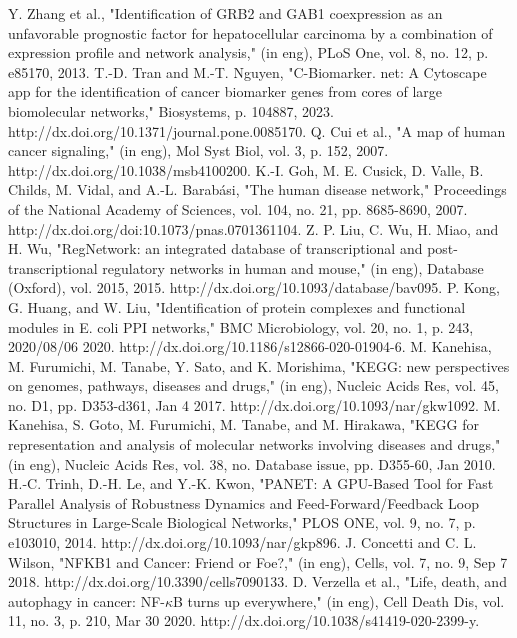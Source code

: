 \documentclass[5p,,preprint,12pt]{elsarticle}
\begin{document}
\begin{thebibliography}{71}
	Y. Zhang et al., "Identification of GRB2 and GAB1 coexpression as an unfavorable prognostic factor for hepatocellular carcinoma by a combination of expression profile and network analysis," (in eng), PLoS One, vol. 8, no. 12, p. e85170, 2013.
	T.-D. Tran and M.-T. Nguyen, "C-Biomarker. net: A Cytoscape app for the identification of cancer biomarker genes from cores of large biomolecular networks," Biosystems, p. 104887, 2023. http://dx.doi.org/10.1371/journal.pone.0085170.
	Q. Cui et al., "A map of human cancer signaling," (in eng), Mol Syst Biol, vol. 3, p. 152, 2007. http://dx.doi.org/10.1038/msb4100200.
	K.-I. Goh, M. E. Cusick, D. Valle, B. Childs, M. Vidal, and A.-L. Barabási, "The human disease network," Proceedings of the National Academy of Sciences, vol. 104, no. 21, pp. 8685-8690, 2007. http://dx.doi.org/doi:10.1073/pnas.0701361104.
	Z. P. Liu, C. Wu, H. Miao, and H. Wu, "RegNetwork: an integrated database of transcriptional and post-transcriptional regulatory networks in human and mouse," (in eng), Database (Oxford), vol. 2015, 2015. http://dx.doi.org/10.1093/database/bav095.
	P. Kong, G. Huang, and W. Liu, "Identification of protein complexes and functional modules in E. coli PPI networks," BMC Microbiology, vol. 20, no. 1, p. 243, 2020/08/06 2020. http://dx.doi.org/10.1186/s12866-020-01904-6.
	M. Kanehisa, M. Furumichi, M. Tanabe, Y. Sato, and K. Morishima, "KEGG: new perspectives on genomes, pathways, diseases and drugs," (in eng), Nucleic Acids Res, vol. 45, no. D1, pp. D353-d361, Jan 4 2017. http://dx.doi.org/10.1093/nar/gkw1092.
	M. Kanehisa, S. Goto, M. Furumichi, M. Tanabe, and M. Hirakawa, "KEGG for representation and analysis of molecular networks involving diseases and drugs," (in eng), Nucleic Acids Res, vol. 38, no. Database issue, pp. D355-60, Jan 2010.
	H.-C. Trinh, D.-H. Le, and Y.-K. Kwon, "PANET: A GPU-Based Tool for Fast Parallel Analysis of Robustness Dynamics and Feed-Forward/Feedback Loop Structures in Large-Scale Biological Networks," PLOS ONE, vol. 9, no. 7, p. e103010, 2014. http://dx.doi.org/10.1093/nar/gkp896.
	J. Concetti and C. L. Wilson, "NFKB1 and Cancer: Friend or Foe?," (in eng), Cells, vol. 7, no. 9, Sep 7 2018. http://dx.doi.org/10.3390/cells7090133.
	D. Verzella et al., "Life, death, and autophagy in cancer: NF-$\kappa$B turns up everywhere," (in eng), Cell Death Dis, vol. 11, no. 3, p. 210, Mar 30 2020. http://dx.doi.org/10.1038/s41419-020-2399-y.

\end{thebibliography}
\end{document}
